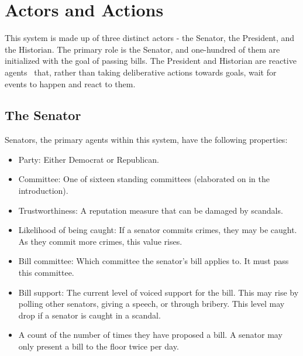 \documentclass{sig-alternate}
\newenvironment{smallitem}
 {\setlength{\topsep}{0pt}
  \setlength{\partopsep}{0pt}
  \setlength{\parskip}{0pt}
  \begin{itemize}
   \setlength{\leftmargin}{.2in}
  \setlength{\parsep}{0pt}
  \setlength{\parskip}{0pt}
  \setlength{\itemsep}{0pt}}
 {\end{itemize}}
\newcommand{\bi}{\begin{smallitem}}
\newcommand{\ei}{\end{smallitem}}
\begin{document}
\section{Actors and Actions} 

This system is made up of three distinct actors - 
the Senator, the President, and the Historian. The primary role is the 
Senator, and one-hundred of them are initialized with the goal of 
passing bills. The President and Historian are reactive agents~\cite{woolridge} that, rather than taking deliberative actions towards goals, wait for events to happen and react to them. 

\subsection{The Senator}

Senators, the primary agents within this system, have the following properties:
\bi
\item Party: Either Democrat or Republican.
\item Committee: One of sixteen standing committees (elaborated on in the introduction).
\item Trustworthiness: A reputation measure that can be damaged by scandals.
\item Likelihood of being caught: If a senator commits crimes, they may be caught. As they commit more crimes, this value rises.
\item Bill committee: Which committee the senator's bill applies to. It must pass this committee.
\item Bill support: The current level of voiced support for the bill. This may rise by polling other senators, giving a speech, or through bribery. This level may drop if a senator is caught in a scandal. 
\item A count of the number of times they have proposed a bill. A senator may only present a bill to the floor twice per day.
\ei
\end{document}
